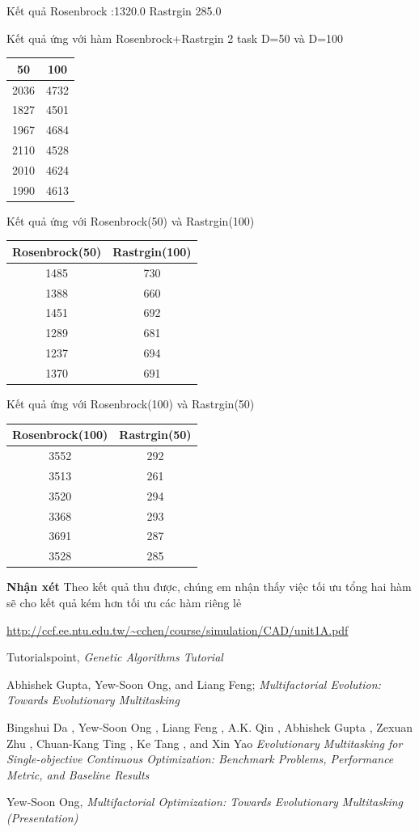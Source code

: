 \documentclass[a4paper,12pt]{report}
\begin{document}
Kết quả Rosenbrock :1320.0  Rastrgin 285.0

Kết quả ứng với hàm Rosenbrock+Rastrgin 2 task   D=50 và D=100
\begin{longtable}{|c |c |}
\hline
50 &100 \\
\hline
2036 & 4732\\
1827 & 4501\\
1967 & 4684\\
2110 & 4528\\
2010 & 4624\\
\hline
\hline
1990 & 4613\\ 
\hline
\end{longtable}
Kết quả ứng với Rosenbrock(50) và Rastrgin(100) \\
\begin{longtable}{|c |c |}
\hline
Rosenbrock(50) &Rastrgin(100) \\
\hline
1485 & 730\\
1388 & 660\\
1451 & 692\\
1289 & 681\\
1237 & 694\\
\hline
\hline
1370 & 691\\ 
\hline
\end{longtable}
Kết quả ứng với Rosenbrock(100) và Rastrgin(50) \\
\begin{longtable}{|c |c |}
\hline
Rosenbrock(100) &Rastrgin(50) \\
\hline
3552 & 292\\
3513 & 261\\
3520 & 294\\
3368 & 293\\
3691 & 287\\
\hline
\hline
3528 & 285\\ 
\hline
\end{longtable}
\textbf{Nhận xét}
Theo kết quả thu được, chúng em nhận thấy việc tối ưu tổng hai hàm sẽ cho kết quả kém hơn tối ưu các hàm riêng lẻ
\begin{thebibliography}{9}
 \url{http://ccf.ee.ntu.edu.tw/~cchen/course/simulation/CAD/unit1A.pdf}

 Tutorialspoint, \textit{Genetic Algorithms Tutorial}

 Abhishek Gupta, Yew-Soon Ong, and Liang Feng; \textit{Multifactorial Evolution: Towards Evolutionary Multitasking}

Bingshui Da
, Yew-Soon Ong
, Liang Feng
, A.K. Qin
, Abhishek Gupta
,
Zexuan Zhu
, Chuan-Kang Ting
, Ke Tang
, and Xin Yao \textit{Evolutionary Multitasking for Single-objective
Continuous Optimization: Benchmark Problems,
Performance Metric, and Baseline Results
}


 Yew-Soon Ong, \textit{Multifactorial Optimization: Towards Evolutionary Multitasking (Presentation)} 
\end{thebibliography}
\end{document}
